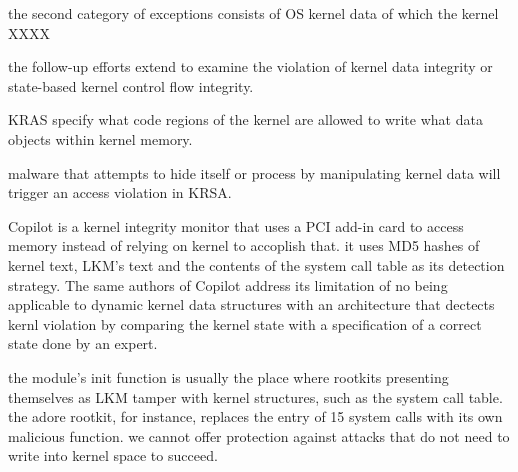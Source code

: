 \documentclass[conference]{IEEEtran}
\begin{document}
the second category of exceptions consists of OS kernel data of which the kernel XXXX

the follow-up efforts extend to examine the violation of kernel data integrity or state-based kernel control flow integrity. 

KRAS specify what code regions of the kernel are allowed to write what data objects within kernel memory. 

malware that attempts to hide itself or process by manipulating kernel data will trigger an access violation in KRSA. 


Copilot is a kernel integrity monitor that uses a PCI add-in card to access memory instead of relying on kernel to accoplish that. it uses MD5 hashes of kernel text, LKM's text and the contents of the system call table as its detection strategy. The same authors of Copilot address its limitation of no being applicable to dynamic kernel data structures with an architecture that dectects kernl violation by comparing the kernel state with a specification of a correct state done by an expert. 

the module's init function is usually the place where rootkits presenting themselves as LKM tamper with kernel structures, such as the system call table. the adore rootkit, for instance, replaces the entry of 15 system calls with its own malicious function. 
we cannot offer protection against attacks that do not need to write into kernel space to succeed. 





\end{document}
